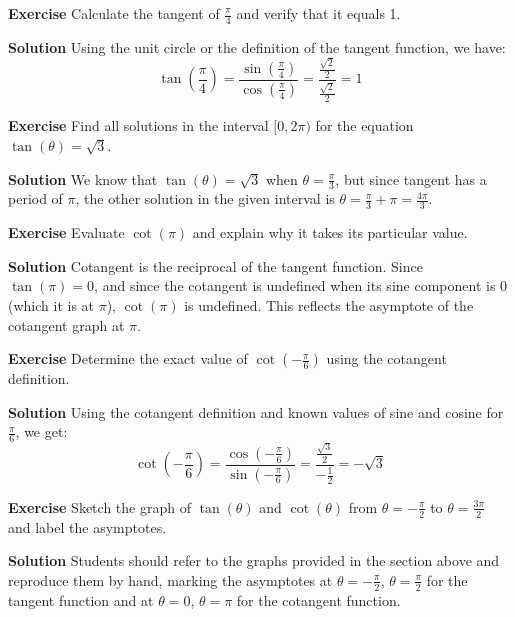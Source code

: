 \documentclass[a4paper,12pt]{book}
\newenvironment{exercise}[1][]
  {\par\medskip\noindent\textbf{Exercise #1} \rmfamily}
  {\medskip}
\newenvironment{solution}[1][]
  {\par\noindent\textbf{Solution #1} \rmfamily}
  {\medskip}
\begin{document}
\begin{exercise}
Calculate the tangent of \(\frac{\pi}{4}\) and verify that it equals 1.
\end{exercise}
\begin{solution}
Using the unit circle or the definition of the tangent function, we have:
\[
\tan\left(\frac{\pi}{4}\right) = \frac{\sin\left(\frac{\pi}{4}\right)}{\cos\left(\frac{\pi}{4}\right)} = \frac{\frac{\sqrt{2}}{2}}{\frac{\sqrt{2}}{2}} = 1
\]
\end{solution}

\begin{exercise}
Find all solutions in the interval \([0, 2\pi)\) for the equation \(\tan(\theta) = \sqrt{3}\).
\end{exercise}
\begin{solution}
We know that \(\tan(\theta) = \sqrt{3}\) when \(\theta = \frac{\pi}{3}\), but since tangent has a period of \(\pi\), the other solution in the given interval is \(\theta = \frac{\pi}{3} + \pi = \frac{4\pi}{3}\).
\end{solution}

\begin{exercise}
Evaluate \(\cot(\pi)\) and explain why it takes its particular value.
\end{exercise}
\begin{solution}
Cotangent is the reciprocal of the tangent function. Since \(\tan(\pi) = 0\), and since the cotangent is undefined when its sine component is 0 (which it is at \(\pi\)), \(\cot(\pi)\) is undefined. This reflects the asymptote of the cotangent graph at \(\pi\).
\end{solution}

\begin{exercise}
Determine the exact value of \(\cot\left(-\frac{\pi}{6}\right)\) using the cotangent definition.
\end{exercise}
\begin{solution}
Using the cotangent definition and known values of sine and cosine for \(\frac{\pi}{6}\), we get:
\[
\cot\left(-\frac{\pi}{6}\right) = \frac{\cos\left(-\frac{\pi}{6}\right)}{\sin\left(-\frac{\pi}{6}\right)} = \frac{\frac{\sqrt{3}}{2}}{-\frac{1}{2}} = -\sqrt{3}
\]
\end{solution}

\begin{exercise}
Sketch the graph of \(\tan(\theta)\) and \(\cot(\theta)\) from \(\theta = -\frac{\pi}{2}\) to \(\theta = \frac{3\pi}{2}\) and label the asymptotes.
\end{exercise}
\begin{solution}
Students should refer to the graphs provided in the section above and reproduce them by hand, marking the asymptotes at \(\theta = -\frac{\pi}{2}\), \(\theta = \frac{\pi}{2}\) for the tangent function and at \(\theta = 0\), \(\theta = \pi\) for the cotangent function.
\end{solution}
\end{document}
